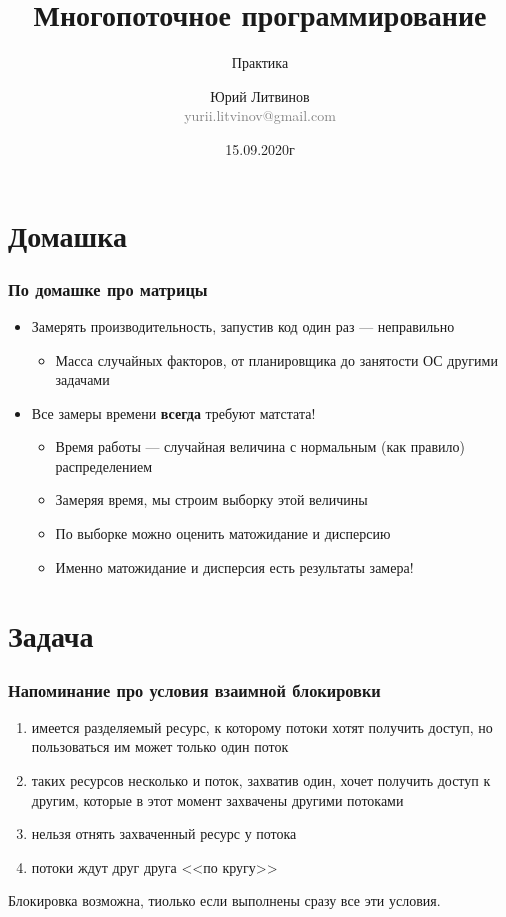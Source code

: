 \documentclass[xetex,mathserif,serif]{beamer}
\title{Многопоточное программирование}
\subtitle{Практика}
\author[Юрий Литвинов]{Юрий Литвинов\\\small{\textcolor{gray}{yurii.litvinov@gmail.com}}}
\date{15.09.2020г}
\begin{document}
    \frame{\titlepage}

    \section{Домашка}

    \begin{frame}
        \frametitle{По домашке про матрицы}
        \begin{itemize}
            \item Замерять производительность, запустив код один раз --- неправильно
            \begin{itemize}
                \item Масса случайных факторов, от планировщика до занятости ОС другими задачами
            \end{itemize}
            \item Все замеры времени \textbf{всегда} требуют матстата!
            \begin{itemize}
                \item Время работы --- случайная величина с нормальным (как правило) распределением
                \item Замеряя время, мы строим выборку этой величины
                \item По выборке можно оценить матожидание и дисперсию
                \item Именно матожидание и дисперсия есть результаты замера!
            \end{itemize}
        \end{itemize}
    \end{frame}

    \section{Задача}

    \begin{frame}
        \frametitle{Напоминание про условия взаимной блокировки}
        \begin{enumerate}
            \item имеется разделяемый ресурс, к которому потоки хотят получить доступ, но пользоваться им может только один поток
            \item таких ресурсов несколько и поток, захватив один, хочет получить доступ к другим, которые в этот момент захвачены другими потоками
            \item нельзя отнять захваченный ресурс у потока
            \item потоки ждут друг друга <<по кругу>>
        \end{enumerate}
        Блокировка возможна, тиолько если выполнены сразу все эти условия.
    \end{frame}
\end{document}
